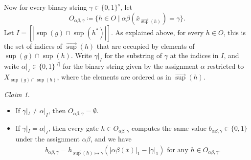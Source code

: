 \documentclass[11pt]{article}
\DeclareMathOperator{\supp}{sup}
\theoremstyle{definition}
\theoremstyle{plain}
\theoremstyle{remark}
\newtheorem{claim}{Claim}[lemma]
\theoremstyle{remark}
\begin{document}
Now for every binary string $\gamma \in \{0,1\}^{s}$, let
\[
O_{\alpha\beta, \gamma} \coloneqq \{h \in O \mid \alpha\beta(\bar{x}_{\vec{\supp}(h)}) = \gamma\}.
\]
Let $I = [|\supp(g) \cap \supp(h^*)|]$. As explained above, for every $h \in O$, this is the set of indices of $\vec{\supp}(h)$ that are occupied by elements of $\supp(g) \cap \supp(h)$. Write $\gamma|_I$ for the substring of $\gamma$ at the indices in $I$, and write $\alpha|_I \in \{0,1\}^{|I|}$ for the binary string given by the assignment $\alpha$ restricted to $X_{\supp(g) \cap \supp(h)}$, where the elements are ordered as in $\vec{\supp}(h)$.
\setcounter{lemma}{3} 
\begin{claim}
	\label{claim:Ogamma}
	~\\
	\vspace*{-1em}
	\begin{itemize}
		\item If $\gamma|_I \neq \alpha|_I$, then $O_{\alpha\beta, \gamma} = \emptyset$.
		\item If $\gamma|_I = \alpha|_I$, then every gate $h \in O_{\alpha\beta, \gamma}$ computes the same value $b_{\alpha\beta, \gamma} \in \{0,1\}$ under the assignment $\alpha\beta$, and we have
		\begin{align*}
			b_{\alpha\beta, \gamma} = h_{\vec{\supp}(h) \mapsto \gamma}(|\alpha\beta(\bar{x})|_1 - |\gamma|_1) \text{ for any } h \in O_{\alpha\beta, \gamma}. 
		\end{align*}
	\end{itemize}
\end{claim}
\end{document}
